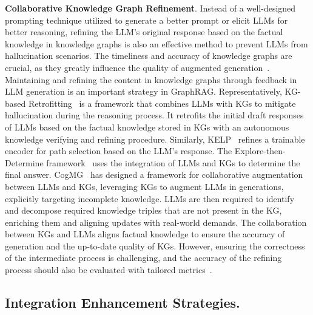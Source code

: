 \documentclass[lettersize,journal]{IEEEtran}
\begin{document}
\noindent\textbf{Collaborative Knowledge Graph Refinement}. 
Instead of a well-designed prompting technique utilized to generate a better prompt or elicit LLMs for better reasoning, refining the LLM’s original response based on the factual knowledge in knowledge graphs is also an effective method to prevent LLMs from hallucination scenarios. 
The timeliness and accuracy of knowledge graphs are crucial, as they greatly influence the quality of augmented generation~\cite{jin2024graph}. Maintaining and refining the content in knowledge graphs through feedback in LLM generation is an important strategy in GraphRAG.
Representatively, KG-based Retrofitting~\cite{guan2024mitigating} is a framework that combines LLMs with KGs to mitigate hallucination during the reasoning process. It retrofits the initial draft responses of LLMs based on the factual knowledge stored in KGs with an autonomous knowledge verifying and refining procedure. Similarly, KELP~\cite{liu2024knowledge} refines a trainable encoder for path selection based on the LLM’s response. The Explore-then-Determine framework~\cite{liu2024explore} uses the integration of LLMs and KGs to determine the final answer. CogMG~\cite{zhou2024cogmg} has designed a framework for collaborative augmentation between LLMs and KGs, leveraging KGs to augment LLMs in generations, explicitly targeting incomplete knowledge. LLMs are then required to identify and decompose required knowledge triples that are not present in the KG, enriching them and aligning updates with real-world demands.
The collaboration between KGs and LLMs aligns factual knowledge to ensure the accuracy of generation and the up-to-date quality of KGs. However, ensuring the correctness of the intermediate process is challenging, and the accuracy of the refining process should also be evaluated with tailored metrics~\cite{xu2024search}.


\subsection{Integration Enhancement Strategies.}
\end{document}

